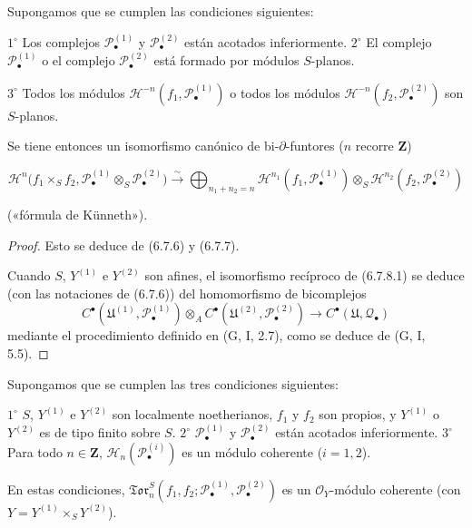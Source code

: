 \begin{theorem}[6.7.8]
\label{III.6.7.8}
Supongamos que se cumplen las condiciones siguientes:

  $1^\circ$
    Los complejos $\mathscr P_\bullet^{(1)}$ y
    $\mathscr P_\bullet^{(2)}$ están acotados inferiormente.
  $2^\circ$
    El complejo $\mathscr P_\bullet^{(1)}$ \textup{o} el complejo
    $\mathscr P_\bullet^{(2)}$ está formado por módulos $S$-planos.

  $3^\circ$
    Todos los módulos $\mathscr H^{-n}(f_1,\mathscr P_\bullet^{(1)})$ \textup{o} todos
    los módulos $\mathscr H^{-n}(f_2,\mathscr P_\bullet^{(2)})$ son
    $S$-planos.

Se tiene entonces un isomorfismo canónico de bi-$\partial$-funtores
($n$ recorre $\mathbf Z$)

\label{III.6.7.8.1}
\[
  \mathscr H^n\bigl(f_1\times_S f_2,
    \mathscr P_\bullet^{(1)}\otimes_S\mathscr P_\bullet^{(2)}\bigr)
  \xrightarrow{\sim}
  \bigoplus_{n_1+n_2=n}
  \mathscr H^{n_1}(f_1,\mathscr P_\bullet^{(1)})
  \otimes_S
  \mathscr H^{n_2}(f_2,\mathscr P_\bullet^{(2)})
  \tag{6.7.8.1}\label{III.6.7.8.1.fr}
\]

(«fórmula de Künneth»).
\end{theorem}

\begin{proof}
Esto se deduce de (6.7.6) y (6.7.7).

Cuando $S$, $Y^{(1)}$ e $Y^{(2)}$ son afines, el isomorfismo recíproco de
(6.7.8.1) se deduce (con las notaciones de (6.7.6)) del homomorfismo de
bicomplejos
\[
  C^\bullet(\mathfrak U^{(1)},\mathscr P_\bullet^{(1)})
  \otimes_A
  C^\bullet(\mathfrak U^{(2)},\mathscr P_\bullet^{(2)})
  \longrightarrow
  C^\bullet(\mathfrak U,\mathscr Q_\bullet)
\]
mediante el procedimiento definido en (G, I, 2.7), como se deduce de
(G, I, 5.5).
\end{proof}

\begin{proposition}[6.7.9]
\label{III.6.7.9}
Supongamos que se cumplen las tres condiciones siguientes:

  $1^\circ$
    $S$, $Y^{(1)}$ e $Y^{(2)}$ son localmente noetherianos, $f_1$ y $f_2$
    son propios, y $Y^{(1)}$ o $Y^{(2)}$ es de tipo finito sobre $S$.
  $2^\circ$
    $\mathscr P_\bullet^{(1)}$ y $\mathscr P_\bullet^{(2)}$ están acotados
    inferiormente.
  $3^\circ$
    Para todo $n\in\mathbf Z$,
    $\mathscr H_n(\mathscr P_\bullet^{(i)})$ es un módulo coherente
    ($i=1,2$).

En estas condiciones,
$\mathfrak{Tor}_n^S
(f_1,f_2;\mathscr P_\bullet^{(1)},\mathscr P_\bullet^{(2)})$ es un
$\mathscr O_Y$-módulo coherente (con
$Y=Y^{(1)}\times_S Y^{(2)}$).
\end{proposition}

